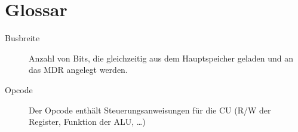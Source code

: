 \chapter{Glossar}
\label{chapter:Anhang-Glossar}

\begin{description}
    \item[Busbreite] Anzahl von Bits, die gleichzeitig aus dem Hauptspeicher geladen und an das MDR angelegt werden.
    \item[Opcode] Der Opcode enthält Steuerungsanweisungen für die CU (R/W der Register, Funktion der ALU, \ldots)
\end{description}
